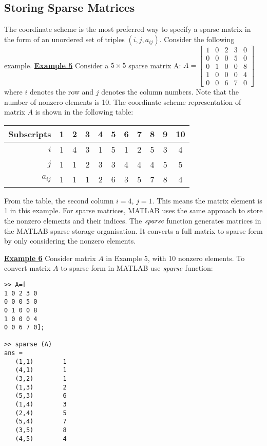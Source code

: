 \subsection{Storing Sparse Matrices}
The coordinate scheme is the most preferred way to specify a sparse matrix in
the form of an unordered set of triples $(i,j, a_{ij})$. Consider the following
example.
\vskip 3pt
\noindent
{\bf\underline {Example 5}}
\vskip 3pt
\noindent
Consider a $5\times5$ sparse matrix A:
\vskip 3pt
\noindent
$
A=
\begin{bmatrix}
1 & 0 & 2 & 3 & 0 \\
0 & 0 & 0 & 5 & 0 \\
0 & 1 & 0 & 0 & 8 \\
1 & 0 & 0 & 0 & 4 \\
0 & 0 & 6 & 7 & 0
\end{bmatrix}
$
\noindent
\vskip 1pt
\noindent
\vskip 1pt
\noindent
where $i$ denotes the row and $j$ denotes the column numbers. Note that the
number of nonzero elements is 10. The coordinate scheme representation of matrix
$A$ is shown in the following table:
\vskip 1pt
\noindent
\begin{center}
    \begin{tabular}{ r | c c c c c c c c c c }
    Subscripts  & 1 & 2 & 3 & 4 & 5 & 6 & 7 & 8 & 9 & 10 \\
    \hline
    $i$         & 1 & 4 & 3 & 1 & 5 & 1 & 2 & 5 & 3 & 4 \\
    $j$         & 1 & 1 & 2 & 3 & 3 & 4 & 4 & 4 & 5 & 5 \\
    $a_{ij}$    & 1 & 1 & 1 & 2 & 6 & 3 & 5 & 7 & 8 & 4 \\
\end{tabular}
\end{center}
\vskip 4pt
\noindent
From the table, the second column $i = 4$, $j= 1$. This means the matrix element
is 1 in this example.  For sparse matrices, MATLAB uses the same approach to
store the nonzero elements and their indices. The $\emph{sparse}$ function
generates matrices in the MATLAB sparse storage organisation. It converts a full
matrix to sparse form by only considering the nonzero elements.

\newpage
\noindent
{\bf\underline {Example 6}}
\vskip 10pt
\noindent
Consider matrix $A$ in Example 5, with 10 nonzero elements. To convert matrix
$A$ to sparse form in MATLAB use $\emph{sparse}$ function:
\noindent
{\ttfamily
\begin{lstlisting}
>> A=[
1 0 2 3 0
0 0 0 5 0
0 1 0 0 8
1 0 0 0 4
0 0 6 7 0];

>> sparse (A)
ans =
   (1,1)        1
   (4,1)        1
   (3,2)        1
   (1,3)        2
   (5,3)        6
   (1,4)        3
   (2,4)        5
   (5,4)        7
   (3,5)        8
   (4,5)        4
\end{lstlisting}
}
